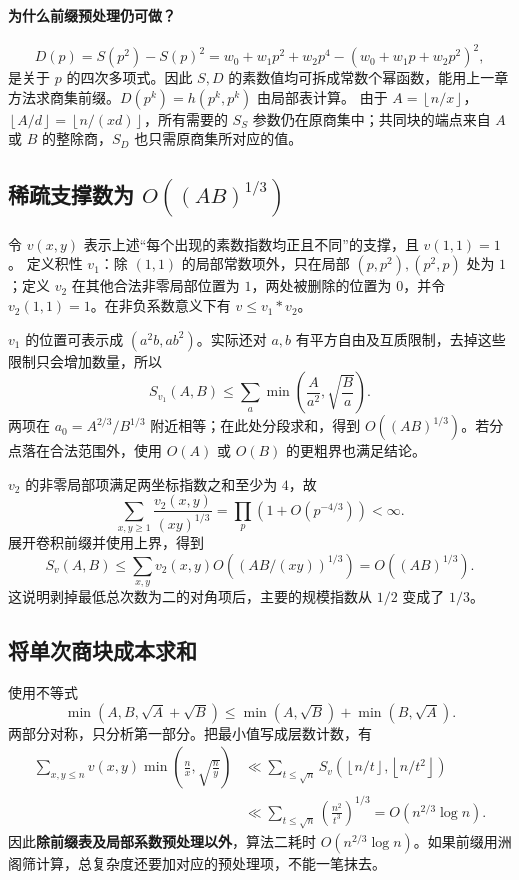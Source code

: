 \documentclass[UTF8,a4paper,11pt,oneside,openany,fontset=fandol]{ctexbook}
\theoremstyle{definition}
\newcommand{\floor}[1]{\left\lfloor #1\right\rfloor}
\begin{document}
\paragraph{为什么前缀预处理仍可做？}
\[
 D(p)=S(p^2)-S(p)^2
 =w_0+w_1p^2+w_2p^4-(w_0+w_1p+w_2p^2)^2,
\]
是关于 $p$ 的四次多项式。因此 $S,D$ 的素数值均可拆成常数个幂函数，能用上一章方法求商集前缀。$D(p^k)=h(p^k,p^k)$ 由局部表计算。
由于 $A=\floor{n/x}$，$\floor{A/d}=\floor{n/(xd)}$，所有需要的 $S_S$ 参数仍在原商集中；共同块的端点来自 $A$ 或 $B$ 的整除商，$S_D$ 也只需原商集所对应的值。

\subsection{稀疏支撑数为 \texorpdfstring{$O((AB)^{1/3})$}{O((AB)1/3)}}
令 $v(x,y)$ 表示上述“每个出现的素数指数均正且不同”的支撑，且 $v(1,1)=1$。
定义积性 $v_1$：除 $(1,1)$ 的局部常数项外，只在局部 $(p,p^2),(p^2,p)$ 处为 $1$；定义 $v_2$ 在其他合法非零局部位置为 $1$，两处被删除的位置为 $0$，并令 $v_2(1,1)=1$。在非负系数意义下有 $v\le v_1*v_2$。

$v_1$ 的位置可表示成 $(a^2b,ab^2)$。实际还对 $a,b$ 有平方自由及互质限制，去掉这些限制只会增加数量，所以
\[
 S_{v_1}(A,B)\le\sum_a\min\left(\frac A{a^2},\sqrt{\frac Ba}\right).
\]
两项在 $a_0=A^{2/3}/B^{1/3}$ 附近相等；在此处分段求和，得到 $O((AB)^{1/3})$。若分点落在合法范围外，使用 $O(A)$ 或 $O(B)$ 的更粗界也满足结论。

$v_2$ 的非零局部项满足两坐标指数之和至少为 $4$，故
\[
 \sum_{x,y\ge1}\frac{v_2(x,y)}{(xy)^{1/3}}
 =\prod_p\left(1+O(p^{-4/3})\right)<\infty.
\]
展开卷积前缀并使用上界，得到
\[
 S_v(A,B)\le\sum_{x,y}v_2(x,y)
 O\!\left((AB/(xy))^{1/3}\right)=O((AB)^{1/3}).
\]
这说明剥掉最低总次数为二的对角项后，主要的规模指数从 $1/2$ 变成了 $1/3$。

\subsection{将单次商块成本求和}
使用不等式
\[
 \min(A,B,\sqrt A+\sqrt B)
 \le\min(A,\sqrt B)+\min(B,\sqrt A).
\]
两部分对称，只分析第一部分。把最小值写成层数计数，有
\[
\begin{aligned}
 \sum_{x,y\le n}v(x,y)\min\left(\frac nx,\sqrt{\frac ny}\right)
 &\ll\sum_{t\le\sqrt n}S_v(\floor{n/t},\floor{n/t^2})\\
 &\ll\sum_{t\le\sqrt n}\left(\frac{n^2}{t^3}\right)^{1/3}
 =O(n^{2/3}\log n).
\end{aligned}
\]
因此\textbf{除前缀表及局部系数预处理以外}，算法二耗时 $O(n^{2/3}\log n)$。如果前缀用洲阁筛计算，总复杂度还要加对应的预处理项，不能一笔抹去。
\end{document}
